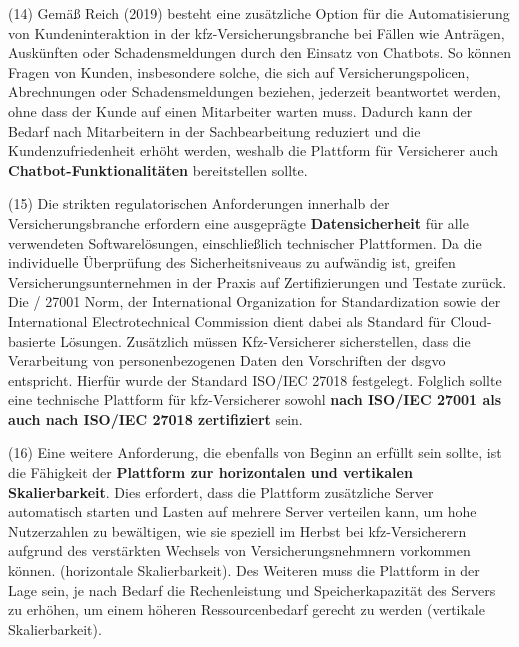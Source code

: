 (14) Gemäß Reich (2019) besteht eine zusätzliche Option für die Automatisierung von Kundeninteraktion in der \ac{kfz}-Versicherungsbranche bei Fällen wie Anträgen, Auskünften oder Schadensmeldungen durch den Einsatz von Chatbots. So können Fragen von Kunden, insbesondere solche, die sich auf Versicherungspolicen, Abrechnungen oder Schadensmeldungen beziehen, jederzeit beantwortet werden, ohne dass der Kunde auf einen Mitarbeiter warten muss. Dadurch kann der Bedarf nach Mitarbeitern in der Sachbearbeitung reduziert und die Kundenzufriedenheit erhöht werden, weshalb die Plattform für Versicherer auch \textbf{Chatbot-Funktionalitäten} bereitstellen sollte. \autocite[Vgl.][S. 300-302]{REICH2019}

(15) Die strikten regulatorischen Anforderungen innerhalb der Versicherungsbranche erfordern eine ausgeprägte \textbf{Datensicherheit} für alle verwendeten Softwarelösungen, einschließlich technischer Plattformen. Da die individuelle Überprüfung des Sicherheitsniveaus zu aufwändig ist, greifen Versicherungsunternehmen in der Praxis auf Zertifizierungen und Testate zurück. \autocite[Vgl.][S. 777]{ZDANOWIECKI2016} Die / 27001 Norm, der International Organization for Standardization sowie der International Electrotechnical Commission dient dabei als Standard für Cloud-basierte Lösungen. Zusätzlich müssen Kfz-Versicherer sicherstellen, dass die Verarbeitung von personenbezogenen Daten den Vorschriften der \ac{dsgvo} entspricht. Hierfür wurde der Standard ISO/IEC 27018 festgelegt.\autocite[Vgl.][S. 194-196]{HENNRICH2023} Folglich sollte eine technische Plattform für \ac{kfz}-Versicherer sowohl \textbf{nach ISO/IEC 27001 als auch nach ISO/IEC 27018 zertifiziert} sein. 

(16) Eine weitere Anforderung, die ebenfalls von Beginn an erfüllt sein sollte, ist die Fähigkeit der \textbf{Plattform zur horizontalen und vertikalen Skalierbarkeit}. Dies erfordert, dass die Plattform zusätzliche Server automatisch starten und Lasten auf mehrere Server verteilen kann, um hohe Nutzerzahlen zu bewältigen, wie sie speziell im Herbst bei \ac{kfz}-Versicherern aufgrund des verstärkten Wechsels von Versicherungsnehmnern vorkommen können. (horizontale Skalierbarkeit). Des Weiteren muss die Plattform in der Lage sein, je nach Bedarf die Rechenleistung und Speicherkapazität des Servers zu erhöhen, um einem höheren Ressourcenbedarf gerecht zu werden (vertikale Skalierbarkeit). \autocite[Vgl.][S. 23]{JAHNERT2020}

\newpage

